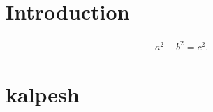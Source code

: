 \documentclass{article}
\begin{document}
\section{Introduction}

\begin{align}
    a^2 + b^2 = c^2 .
\end{align}
\section{kalpesh}
\end{document}
